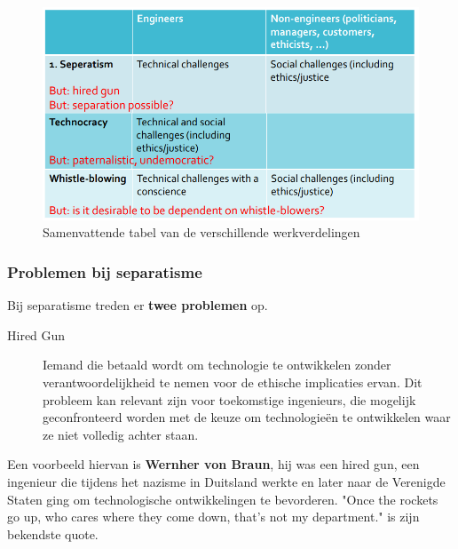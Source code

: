 \documentclass[../summary.tex]{subfiles}
\begin{document}
	\begin{figure}[H]
		\centering
		\includegraphics[width=0.8\linewidth]{../images/division-of-labour-table}
		\caption{Samenvattende tabel van de verschillende werkverdelingen}
		\label{fig:division-of-labour-table}
	\end{figure}
	
	
	
	
	\newpage
		
	\subsubsection{Problemen bij separatisme}
	Bij separatisme treden er \textbf{twee problemen} op.
	\begin{description}
		\item[Hired Gun] Iemand die betaald wordt om technologie te ontwikkelen zonder verantwoordelijkheid te nemen voor de ethische implicaties ervan. Dit probleem kan relevant  zijn voor toekomstige ingenieurs, die mogelijk geconfronteerd worden met de keuze om technologieën te ontwikkelen waar ze niet volledig achter staan.
	\end{description}
	Een voorbeeld hiervan is \textbf{Wernher von Braun}, hij was een hired gun, een ingenieur die tijdens het nazisme in Duitsland werkte en later naar de Verenigde Staten ging om technologische ontwikkelingen te bevorderen. "Once the rockets go up, who cares where they come down, that's not my department." is zijn bekendste quote.
	
\end{document}
